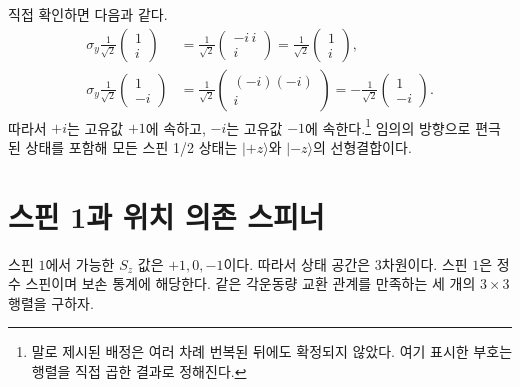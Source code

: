 직접 확인하면 다음과 같다.
\begin{align}
\sigma_y\frac{1}{\sqrt2}
\begin{pmatrix}
1\\
i
\end{pmatrix}
&=
\frac{1}{\sqrt2}
\begin{pmatrix}
-i\,i\\
i
\end{pmatrix}
=
\frac{1}{\sqrt2}
\begin{pmatrix}
1\\
i
\end{pmatrix},\\
\sigma_y\frac{1}{\sqrt2}
\begin{pmatrix}
1\\
-i
\end{pmatrix}
&=
\frac{1}{\sqrt2}
\begin{pmatrix}
(-i)(-i)\\
i
\end{pmatrix}
=
-\frac{1}{\sqrt2}
\begin{pmatrix}
1\\
-i
\end{pmatrix}.
\end{align}
따라서 \(+i\)는 고유값 \(+1\)에 속하고, \(-i\)는 고유값 \(-1\)에 속한다.\footnote{말로 제시된 배정은 여러 차례 번복된 뒤에도 확정되지 않았다. 여기 표시한 부호는 행렬을 직접 곱한 결과로 정해진다.} 임의의 방향으로 편극된 상태를 포함해 모든 스핀 1/2 상태는 \(|+z\rangle\)와 \(|-z\rangle\)의 선형결합이다.

\section{스핀 1과 위치 의존 스피너}

스핀 \(1\)에서 가능한 \(S_z\) 값은 \(+1,0,-1\)이다. 따라서 상태 공간은 3차원이다. 스핀 \(1\)은 정수 스핀이며 보손 통계에 해당한다. 같은 각운동량 교환 관계를 만족하는 세 개의 \(3\times3\) 행렬을 구하자.

